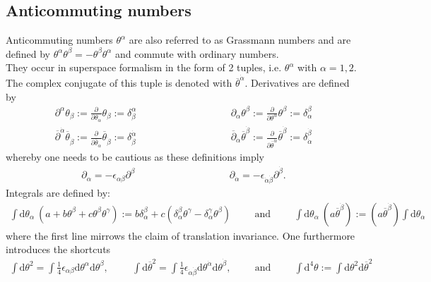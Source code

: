 \subsection{Anticommuting numbers}
Anticommuting numbers $\theta^\alpha$ are also referred to as Grassmann numbers and are defined by $\theta^\alpha\theta^\beta = -\theta^\beta\theta^\alpha$ and commute with ordinary numbers.\\
They occur in superspace formalism in the form of 2 tuples, i.e. $\theta^\alpha$ with $\alpha=1,2$. The complex conjugate of this tuple is denoted with $\overline{\theta}^{\dot{\alpha}}$. 
Derivatives are defined by
\begin{align}
\partial^\alpha \theta_\beta := \frac{\partial}{\partial \theta_\alpha} \theta_\beta := \delta^\alpha_\beta \hspace{4cm} \partial_\alpha \theta^\beta := \frac{\partial}{\partial \theta^\alpha} \theta^\beta := \delta_\alpha^\beta\nonumber\\
\overline{\partial}^{\dot{\alpha}} \overline{\theta}_{\dot{\beta}} := \frac{\partial}{\partial \overline{\theta}_{\dot{\alpha}}} \overline{\theta}_{\dot{\beta}} := \delta^{\dot{\alpha}}_{\dot{\beta}} \hspace{4cm} \overline{\partial}_{\dot{\alpha}} \overline{\theta}^{\dot{\beta}} := \frac{\partial}{\partial \overline{\theta}^{\dot{\alpha}}} \overline{\theta}^{\dot{\beta}} := \delta_{\dot{\alpha}}^{\dot{\beta}}
\end{align}
whereby one needs to be cautious as these definitions imply
\begin{align}
\partial_\alpha = -\epsilon_{\alpha\beta}\partial^\beta \hspace{4cm} \partial_{\dot{\alpha}} = -\epsilon_{\dot{\alpha}\dot{\beta}}\partial^{\dot{\beta}}.
\end{align}
Integrals are defined by:
\begin{align}
\int\mathrm{d}\theta_\alpha\ (a+b \theta^\beta + c\theta^\beta \theta^\gamma) := b\delta_{\alpha}^{\beta} + c (\delta_\alpha^\beta \theta^\gamma - \delta_\alpha^\gamma \theta^\beta) \hspace{1cm} \mathrm{and} \hspace{1cm}
\int\mathrm{d}\theta_\alpha\ (a\overline{\theta}^{\dot{\beta}}) := (a\overline{\theta}^{\dot{\beta}}) \int\mathrm{d}\theta_\alpha\
\end{align}
where the first line mirrows the claim of translation invariance. One furthermore introduces the shortcuts
\begin{align}
\int \mathrm{d}\theta^2 = \int\frac{1}{4}\epsilon_{\alpha\beta} \mathrm{d}\theta^\alpha\mathrm{d}\theta^\beta, \hspace{1cm}
\int \mathrm{d}\overline{\theta}^2 = \int\frac{1}{4}\epsilon_{\dot{\alpha}\dot{\beta}} \mathrm{d}\theta^{\dot{\alpha}}\mathrm{d}\theta^{\dot{\beta}}, \hspace{1cm} \mathrm{and} \hspace{1cm}
\int \mathrm{d}^4\theta := \int \mathrm{d}\theta^2\mathrm{d}\overline{\theta}^2
\end{align}


